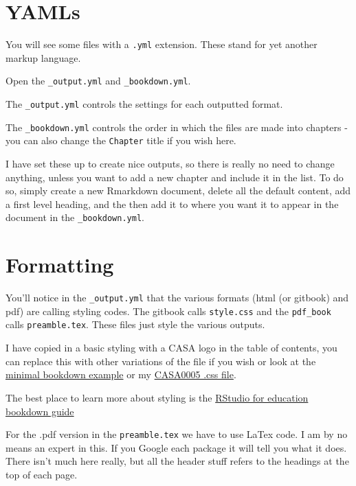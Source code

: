 \documentclass[
  12pt,
  oneside]{book}
\begin{document}
\section{YAMLs}\label{yamls}

You will see some files with a \texttt{.yml} extension. These stand for yet another markup language.

Open the \texttt{\_output.yml} and \texttt{\_bookdown.yml}.

The \texttt{\_output.yml} controls the settings for each outputted format.

The \texttt{\_bookdown.yml} controls the order in which the files are made into chapters - you can also change the \texttt{Chapter} title if you wish here.

I have set these up to create nice outputs, so there is really no need to change anything, unless you want to add a new chapter and include it in the list. To do so, simply create a new Rmarkdown document, delete all the default content, add a first level heading, and the then add it to where you want it to appear in the document in the \texttt{\_bookdown.yml}.

\section{Formatting}\label{formatting}

You'll notice in the \texttt{\_output.yml} that the various formats (html (or gitbook) and pdf) are calling styling codes. The gitbook calls \texttt{style.css} and the \texttt{pdf\_book} calls \texttt{preamble.tex}. These files just style the various outputs.

I have copied in a basic styling with a CASA logo in the table of contents, you can replace this with other variations of the file if you wish or look at the \href{https://github.com/rstudio/bookdown-demo}{minimal bookdown example} or my \href{https://github.com/andrewmaclachlan/CASA0005repo/blob/master/assets/style.css}{CASA0005 .css file}.

The best place to learn more about styling is the \href{https://rstudio4edu.github.io/rstudio4edu-book/intro-bookdown.html}{RStudio for education bookdown guide}

For the .pdf version in the \texttt{preamble.tex} we have to use LaTex code. I am by no means an expert in this. If you Google each package it will tell you what it does. There isn't much here really, but all the header stuff refers to the headings at the top of each page.
\end{document}
